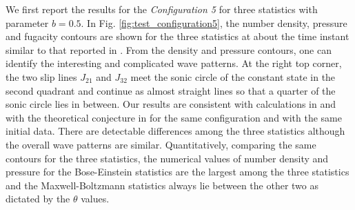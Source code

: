 \documentclass{rsproca}%
\begin{document}
We first report the results for the \emph{Configuration 5} for three statistics with parameter $b=0.5$. In Fig. \ref{fig:test_configuration5}, the number density, pressure and fugacity contours are shown for the three statistics at about the time instant similar to that reported in \cite{Laxliu95}\cite{schultzrinne}. From the density and pressure contours, one can identify the interesting and complicated wave patterns.   At the right top corner, the two slip lines $J_{21}$ and $J_{32}$ meet the sonic circle of the constant state in the second quadrant and continue as almost straight lines so that a quarter of the sonic circle lies in between.  Our results are consistent with calculations in \cite{Laxliu95}\cite{schultzrinne} and with the theoretical conjecture in \cite{ZhangZheng90} for the same configuration and with the same initial data.   There are detectable differences among the three statistics although the overall wave patterns are similar. Quantitatively, comparing the same contours for the three statistics, the numerical values of number density and pressure for the Bose-Einstein statistics are the largest among the three statistics and the Maxwell-Boltzmann statistics always lie between the other two as dictated by the $\theta$ values. \\
\end{document}
